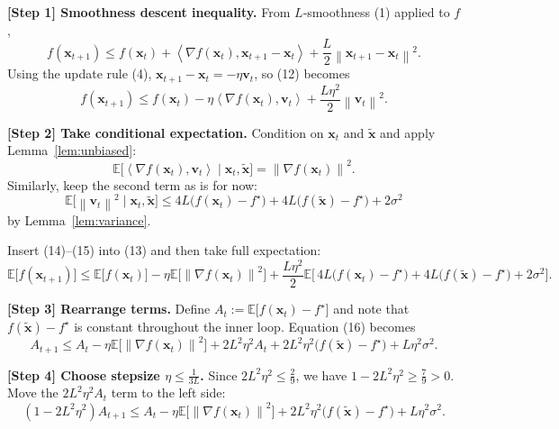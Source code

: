\documentclass{article}
\newcommand{\EE}{\mathbb{E}}
\newcommand{\norm}[1]{\left\|#1\right\|}
\newcommand{\inner}[2]{\left\langle #1,#2\right\rangle}
\newcommand{\grad}{\nabla}
\begin{document}
\noindent\textbf{[Step 1] Smoothness descent inequality.}
From $L$‑smoothness (1) applied to $f$,
\[
f(\mathbf{x}_{t+1})
\le f(\mathbf{x}_{t})+\inner{\grad f(\mathbf{x}_{t})}{\mathbf{x}_{t+1}-\mathbf{x}_{t}}
+\frac{L}{2}\norm{\mathbf{x}_{t+1}-\mathbf{x}_{t}}^{2}.
\tag{12}
\]
Using the update rule (4), $\mathbf{x}_{t+1}-\mathbf{x}_{t}=-\eta\mathbf{v}_{t}$,
so (12) becomes
\[
f(\mathbf{x}_{t+1})
\le f(\mathbf{x}_{t})-\eta\inner{\grad f(\mathbf{x}_{t})}{\mathbf{v}_{t}}
+\frac{L\eta^{2}}{2}\norm{\mathbf{v}_{t}}^{2}.
\tag{13}
\]

\noindent\textbf{[Step 2] Take conditional expectation.}
Condition on $\mathbf{x}_{t}$ and $\tilde{\mathbf{x}}$ and apply Lemma~\ref{lem:unbiased}:
\[
\EE\!\big[\inner{\grad f(\mathbf{x}_{t})}{\mathbf{v}_{t}}\mid\mathbf{x}_{t},\tilde{\mathbf{x}}\big]
=\norm{\grad f(\mathbf{x}_{t})}^{2}.
\tag{14}
\]
Similarly, keep the second term as is for now:
\[
\EE\!\big[\norm{\mathbf{v}_{t}}^{2}\mid\mathbf{x}_{t},\tilde{\mathbf{x}}\big]
\le 4L\big(f(\mathbf{x}_{t})-f^{\star}\big)
   +4L\big(f(\tilde{\mathbf{x}})-f^{\star}\big)
   +2\sigma^{2}
\tag{15}
\]
by Lemma~\ref{lem:variance}.

Insert (14)–(15) into (13) and then take full expectation:
\[
\EE\!\big[f(\mathbf{x}_{t+1})\big]
\le \EE\!\big[f(\mathbf{x}_{t})\big]
-\eta\EE\!\big[\norm{\grad f(\mathbf{x}_{t})}^{2}\big]
+\frac{L\eta^{2}}{2}\EE\!\big[\,4L\!\big(f(\mathbf{x}_{t})-f^{\star}\big)
   +4L\!\big(f(\tilde{\mathbf{x}})-f^{\star}\big)+2\sigma^{2}\big].
\tag{16}
\]

\noindent\textbf{[Step 3] Rearrange terms.}
Define $A_{t}:=\EE\!\big[f(\mathbf{x}_{t})-f^{\star}\big]$ and note that
$f(\tilde{\mathbf{x}})-f^{\star}$ is constant throughout the inner loop.
Equation (16) becomes
\[
A_{t+1}
\le A_{t}
-\eta\EE\!\big[\norm{\grad f(\mathbf{x}_{t})}^{2}\big]
+2L^{2}\eta^{2}A_{t}
+2L^{2}\eta^{2}\big(f(\tilde{\mathbf{x}})-f^{\star}\big)
+L\eta^{2}\sigma^{2}.
\tag{17}
\]

\noindent\textbf{[Step 4] Choose stepsize $\eta\le\frac{1}{3L}$.}
Since $2L^{2}\eta^{2}\le\frac{2}{9}$, we have $1-2L^{2}\eta^{2}\ge\frac{7}{9}>0$.
Move the $2L^{2}\eta^{2}A_{t}$ term to the left side:
\[
(1-2L^{2}\eta^{2})A_{t+1}
\le A_{t}
-\eta\EE\!\big[\norm{\grad f(\mathbf{x}_{t})}^{2}\big]
+2L^{2}\eta^{2}\big(f(\tilde{\mathbf{x}})-f^{\star}\big)
+L\eta^{2}\sigma^{2}.
\tag{18}
\]
\end{document}
